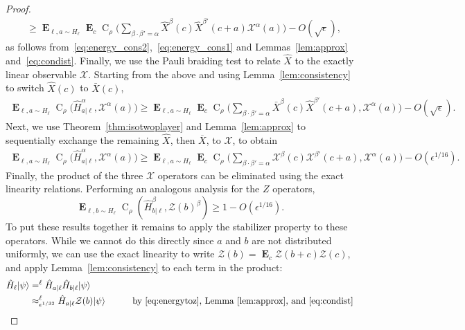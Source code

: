 \documentclass[11pt,letterpaper]{article}
\newcommand{\<}{\langle}
\renewcommand{\>}{\rangle}
\newcommand{\thmref}[1]{Theorem~\ref{thm:#1}}
\newcommand{\lemref}[1]{Lemma~\ref{lem:#1}}
\newcommand{\myeqref}[1]{\eqref{eq:#1}}
\newcommand{\ket}[1]{| #1 \>}
\newcommand{\eps}{\epsilon}
\newcommand{\Xlin}{\mathcal{X}}
\newcommand{\Zlin}{\mathcal{Z}}
\DeclareMathOperator{\E}{\mathbf{E}}
\DeclareMathOperator{\CON}{C}
\newcommand{\app}[2]{\approx_{#1}^{#2}}
\newcommand{\sx}{\hat{X}}
\renewcommand{\sp}{\hat{H}}
\newcommand{\cx}{\bar{X}}
\begin{document}
\begin{proof}
\begin{align*}
  &\geq \E_{\ell, a\sim H_\ell} \E_c \CON_\rho\Big(\sum_{\beta \cdot \beta' = \alpha} \sx^{\beta}(c) \sx^{\beta'}(c+a) \Xlin^\alpha(a)\Big) - O(\sqrt{\eps_{}}),
\end{align*}
as follows from~\eqref{eq:energy_cons2},~\eqref{eq:energy_cons1} and Lemmas~\ref{lem:approx} and~\myeqref{condist}.  Finally, we use the Pauli braiding test to relate
$\sx$ to the exactly linear observable $\Xlin$. Starting from the above and using \lemref{consistency} to switch $\sx(c)$ to $\cx(c)$,
\begin{align*}
  \E_{\ell, a \sim H_\ell} \CON_\rho\Big(\sp_{a|\ell}^{\alpha}, \Xlin^{\alpha}(a) \Big) 
                     \geq \E_{\ell, a\sim H_\ell} \E_c \CON_\rho\Big(
                       \sum_{\beta \cdot \beta' = \alpha}
                       \cx^{\beta}(c) \sx^{\beta'}(c+a),
                       \Xlin^\alpha(a)\Big)
                        - O(\sqrt{\eps_{}}).
												\end{align*}
 Next, we use \thmref{isotwoplayer} and \lemref{approx} to sequentially exchange the remaining $\sx$, then $\overline{X}$, to $\Xlin$, to obtain 
\begin{align}
   \E_{\ell, a \sim H_\ell} \CON_\rho\Big(\sp_{a|\ell}^{\alpha}, \Xlin^{\alpha}(a) \Big) 
	\geq \E_{\ell, a\sim H_\ell} \E_c  \CON_\rho\Big( \sum_{\beta \cdot \beta' = \alpha} \Xlin^{\beta}(c) \Xlin^{\beta'}(c+a) ,\Xlin^\alpha(a)\Big)  - O({\eps}^{1/16}). \label{eq:energytox}
	\end{align}
Finally, the product of the three $\Xlin$ operators can be eliminated using the exact linearity relations. Performing an analogous analysis for the $Z$ operators,
  \begin{equation} \E_{\ell, b \sim H_\ell} \CON_\rho(\sp_{b|\ell}^{\beta}, \Zlin(b)^\beta) \geq 1 - O(\eps_{}^{1/16}). \label{eq:energytoz} \end{equation}
 To put these results together it remains to apply the stabilizer property to these operators. While we cannot do this directly since $a$ and $b$ are not distributed uniformly, we can use the exact linearity to write $\Zlin(b) = \E_{c} \Zlin(b+c) \Zlin(c)$, and apply Lemma~\ref{lem:consistency} to each term in the product:
  \begin{alignat*}{2}
     \sp_\ell \ket{\psi} &=^{\ell} \sp_{a|\ell} \sp_{b|\ell} \ket{\psi} \\
    &\app{\eps^{1/32}}{\ell}  \sp_{a|\ell} \Zlin(b) \ket{\psi} \qquad &\text{by \myeqref{energytoz}, \lemref{approx}, and \myeqref{condist}}\\

\end{alignat*}
\end{proof}
\end{document}
